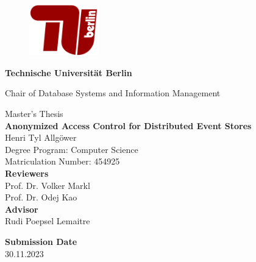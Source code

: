 \thispagestyle{empty}
\begin{center}

\begin{figure}[t]
    \centering
    \includegraphics[width=3cm]{./img/TU-Berlin-Logo.pdf}%
\end{figure}

{\LARGE \textbf{Technische Universit\"at Berlin}}

\vspace{0.5cm}

{\large Chair of Database Systems and Information Management\\[1.6mm]}


\vspace{2.0cm}

{\LARGE Master's Thesis}\\

\vspace{2.5cm}
{\LARGE \textbf{Anonymized Access Control for Distributed Event Stores}}\\
\vspace{1.0cm}
Henri Tyl Allgöwer \\
Degree Program: Computer Science\\
Matriculation Number: 454925\\

\vspace*{2.5cm}
\textbf{Reviewers}\\
Prof. Dr. Volker Markl\\
Prof. Dr. Odej Kao\\
\vspace*{0.5cm}
\textbf{Advisor}\\
Rudi Poepsel Lemaitre\\
\vspace{0.5 cm}

\textbf{Submission Date}\\
30.11.2023\\ %
\end{center}

